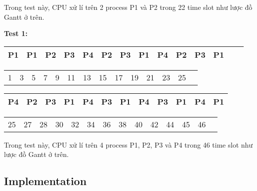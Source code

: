\vspace{0.5cm}

Trong test này, CPU xử lí trên 2 process P1 và P2 trong 22 time slot như lược đồ Gantt ở trên.


\vspace{0.5cm}

\textbf{Test 1:}

\vspace{0.5cm}

\begin{table}[!htp]
    \centering            %
    \def\arraystretch{2}  %
    
    \begin{tabular}{|m{0.8cm}|m{0.8cm}|m{0.8cm}|m{0.8cm}|m{0.8cm}|m{0.8cm}|m{0.8cm}|m{0.8cm}|m{0.8cm}|m{0.8cm}|m{0.8cm}|m{0.8cm}|m{0.8cm}|c}
        \hline
        P1 & P1 & P2 & P3 & P4 & P2 & P3 & P1 & P4 & P2 & P3 & P1\\
        \hline
    \end{tabular}
    \begin{tabular}{m{0.8cm}m{0.8cm}m{0.8cm}m{0.8cm}m{0.8cm}m{0.8cm}m{0.8cm}m{0.8cm}m{0.8cm}m{0.8cm}m{0.8cm}m{0.8cm}m{0.8cm}l}
        1 & 3 & 5 & 7 & 9 & 11 & 13 & 15 & 17 & 19 & 21 & 23 & 25\\
	\end{tabular}

	\begin{tabular}{|m{0.8cm}|m{0.4cm}|m{0.8cm}|m{0.8cm}|m{0.8cm}|m{0.8cm}|m{0.8cm}|m{0.8cm}|m{0.8cm}|m{0.8cm}|m{0.8cm}|m{0.4cm}|}
        \hline
        P4 & P2 & P3 & P1 & P4 & P3 & P1 & P4 & P3 & P1 & P4 & P1\\
        \hline
    \end{tabular}
    \begin{tabular}{m{0.8cm}m{0.4cm}m{0.8cm}m{0.8cm}m{0.8cm}m{0.8cm}m{0.8cm}m{0.8cm}m{0.8cm}m{0.8cm}m{0.8cm}m{0.4cm}m{0.8cm}l}
        25 & 27 & 28 & 30 & 32 & 34 & 36 & 38 & 40 & 42 & 44 & 45 & 46\\
	\end{tabular}
\end{table}

\vspace{0.5cm}

Trong test này, CPU xử lí trên 4 process P1, P2, P3 và P4 trong 46 time slot như lược đồ Gantt ở trên.

\newpage
\subsection{Implementation}

